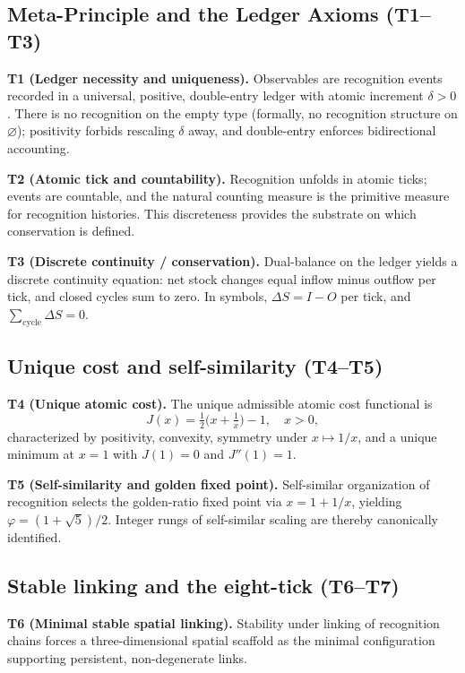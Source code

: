 \documentclass[11pt]{article}
\begin{document}
\subsection{Meta\mbox{-}Principle and the Ledger Axioms (T1--T3)}
\textbf{T1 (Ledger necessity and uniqueness).} Observables are recognition events recorded in a universal, positive, double\mbox{-}entry ledger with atomic increment \(\delta>0\). There is no recognition on the empty type (formally, no recognition structure on \(\varnothing\)); positivity forbids rescaling \(\delta\) away, and double\mbox{-}entry enforces bidirectional accounting.

\textbf{T2 (Atomic tick and countability).} Recognition unfolds in atomic ticks; events are countable, and the natural counting measure is the primitive measure for recognition histories. This discreteness provides the substrate on which conservation is defined.

\textbf{T3 (Discrete continuity / conservation).} Dual\mbox{-}balance on the ledger yields a discrete continuity equation: net stock changes equal inflow minus outflow per tick, and closed cycles sum to zero. In symbols, \(\Delta S=I-O\) per tick, and \(\sum_{\text{cycle}}\Delta S=0\).

\subsection{Unique cost and self\mbox{-}similarity (T4--T5)}
\textbf{T4 (Unique atomic cost).} The unique admissible atomic cost functional is
\[ J(x)=\tfrac{1}{2}\bigl(x+\tfrac{1}{x}\bigr)-1, \quad x>0, \]
characterized by positivity, convexity, symmetry under \(x\mapsto 1/x\), and a unique minimum at \(x=1\) with \(J(1)=0\) and \(J''(1)=1\).

\textbf{T5 (Self\mbox{-}similarity and golden fixed point).} Self\mbox{-}similar organization of recognition selects the golden\mbox{-}ratio fixed point via \(x=1+1/x\), yielding \(\varphi=(1+\sqrt{5})/2\). Integer rungs of self\mbox{-}similar scaling are thereby canonically identified.

\subsection{Stable linking and the eight\mbox{-}tick (T6--T7)}
\textbf{T6 (Minimal stable spatial linking).} Stability under linking of recognition chains forces a three\mbox{-}dimensional spatial scaffold as the minimal configuration supporting persistent, non\mbox{-}degenerate links.
\end{document}
